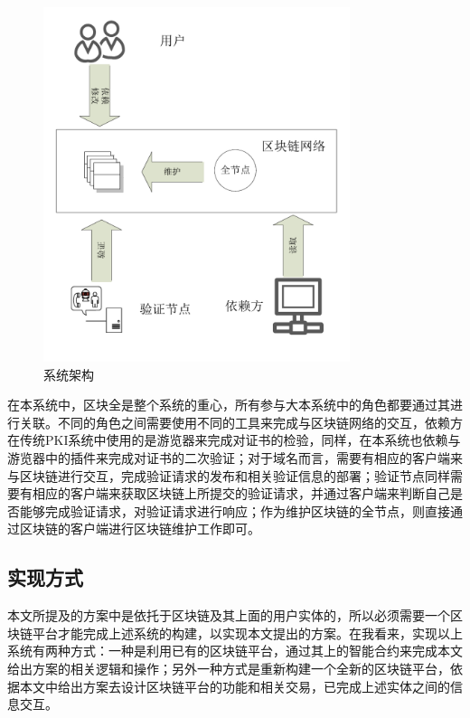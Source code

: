 \begin{figure}[htbp]
 	\centering
 	\includegraphics[width = 0.8\textwidth]{img/system_framework}
 	\caption{系统架构}\label{fig:framework}
\end{figure}



在本系统中，区块全是整个系统的重心，所有参与大本系统中的角色都要通过其进行关联。不同的角色之间需要使用不同的工具来完成与区块链网络的交互，依赖方在传统PKI系统中使用的是游览器来完成对证书的检验，同样，在本系统也依赖与游览器中的插件来完成对证书的二次验证；对于域名而言，需要有相应的客户端来与区块链进行交互，完成验证请求的发布和相关验证信息的部署；验证节点同样需要有相应的客户端来获取区块链上所提交的验证请求，并通过客户端来判断自己是否能够完成验证请求，对验证请求进行响应；作为维护区块链的全节点，则直接通过区块链的客户端进行区块链维护工作即可。

\subsection{实现方式}

本文所提及的方案中是依托于区块链及其上面的用户实体的，所以必须需要一个区块链平台才能完成上述系统的构建，以实现本文提出的方案。在我看来，实现以上系统有两种方式：一种是利用已有的区块链平台，通过其上的智能合约来完成本文给出方案的相关逻辑和操作；另外一种方式是重新构建一个全新的区块链平台，依据本文中给出方案去设计区块链平台的功能和相关交易，已完成上述实体之间的信息交互。

